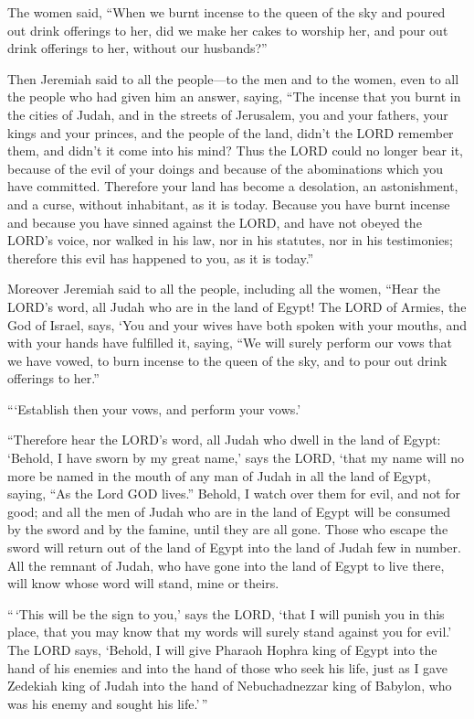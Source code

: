  The women said, ``When we burnt incense to the queen of
the sky and poured out drink offerings to her, did we make her cakes to
worship her, and pour out drink offerings to her, without our
husbands?''

 Then Jeremiah said to all the people---to the men and to
the women, even to all the people who had given him an answer, saying,
 ``The incense that you burnt in the cities of Judah, and
in the streets of Jerusalem, you and your fathers, your kings and your
princes, and the people of the land, didn't the LORD remember them, and
didn't it come into his mind?  Thus the LORD could no
longer bear it, because of the evil of your doings and because of the
abominations which you have committed. Therefore your land has become a
desolation, an astonishment, and a curse, without inhabitant, as it is
today.  Because you have burnt incense and because you have
sinned against the LORD, and have not obeyed the LORD's voice, nor
walked in his law, nor in his statutes, nor in his testimonies;
therefore this evil has happened to you, as it is today.''

 Moreover Jeremiah said to all the people, including all
the women, ``Hear the LORD's word, all Judah who are in the land of
Egypt!  The LORD of Armies, the God of Israel, says, `You
and your wives have both spoken with your mouths, and with your hands
have fulfilled it, saying, ``We will surely perform our vows that we
have vowed, to burn incense to the queen of the sky, and to pour out
drink offerings to her.''

```Establish then your vows, and perform your vows.'

 ``Therefore hear the LORD's word, all Judah who dwell in
the land of Egypt: `Behold, I have sworn by my great name,' says the
LORD, `that my name will no more be named in the mouth of any man of
Judah in all the land of Egypt, saying, ``As the Lord GOD lives.''
 Behold, I watch over them for evil, and not for good; and
all the men of Judah who are in the land of Egypt will be consumed by
the sword and by the famine, until they are all gone. 
Those who escape the sword will return out of the land of Egypt into the
land of Judah few in number. All the remnant of Judah, who have gone
into the land of Egypt to live there, will know whose word will stand,
mine or theirs.

 ``\,`This will be the sign to you,' says the LORD, `that I
will punish you in this place, that you may know that my words will
surely stand against you for evil.'  The LORD says,
`Behold, I will give Pharaoh Hophra king of Egypt into the hand of his
enemies and into the hand of those who seek his life, just as I gave
Zedekiah king of Judah into the hand of Nebuchadnezzar king of Babylon,
who was his enemy and sought his life.'\,''

